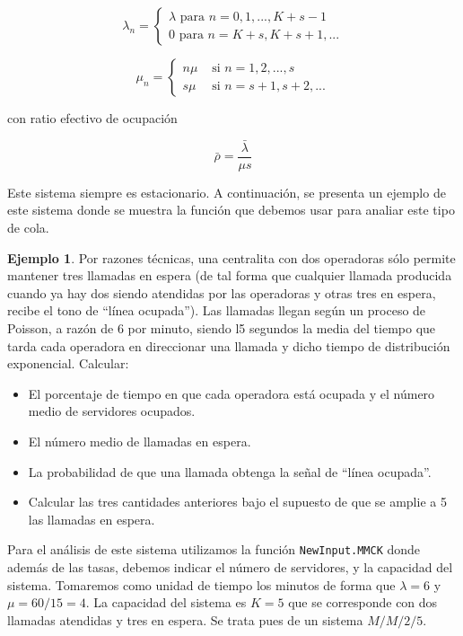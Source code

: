 \documentclass[
]{book}
\providecommand{\tightlist}{%
  \setlength{\itemsep}{0pt}\setlength{\parskip}{0pt}}
\theoremstyle{definition}
\theoremstyle{definition}
\newtheorem{example}{Ejemplo}[chapter]
\theoremstyle{definition}
\theoremstyle{definition}
\theoremstyle{remark}
\begin{document}
\[\lambda_n = 
\begin{cases}
\lambda \text{ para } n = 0, 1,..., K+s-1\\
0 \text{ para } n = K+s, K+s+1,...
\end{cases}
\]

\[\mu_n = 
\begin{cases}
n\mu & \text{ si } n = 1, 2,...,s\\
s\mu & \text{ si } n = s+1, s+2,...
\end{cases}
\]

con ratio efectivo de ocupación

\[\bar{\rho} = \frac{\bar{\lambda}}{\mu s}\]

Este sistema siempre es estacionario. A continuación, se presenta un ejemplo de este sistema donde se muestra la función que debemos usar para analiar este tipo de cola.

\begin{example}

Por razones técnicas, una centralita con dos operadoras sólo permite mantener tres llamadas en espera (de tal forma que cualquier llamada producida cuando ya hay dos siendo atendidas por las operadoras y otras tres en espera, recibe el tono de ``línea ocupada''). Las llamadas llegan según un proceso de Poisson, a razón de 6 por minuto, siendo l5 segundos la media del tiempo que tarda cada operadora en direccionar una llamada y dicho tiempo de distribución exponencial. Calcular:

\begin{itemize}
\tightlist
\item
  El porcentaje de tiempo en que cada operadora está ocupada y el número medio de servidores ocupados.
\item
  El número medio de llamadas en espera.
\item
  La probabilidad de que una llamada obtenga la señal de ``línea ocupada''.
\item
  Calcular las tres cantidades anteriores bajo el supuesto de que se amplie a 5 las llamadas en espera.
\end{itemize}

\end{example}

Para el análisis de este sistema utilizamos la función \texttt{NewInput.MMCK} donde además de las tasas, debemos indicar el número de servidores, y la capacidad del sistema. Tomaremos como unidad de tiempo los minutos de forma que \(\lambda = 6\) y \(\mu = 60/15 = 4\). La capacidad del sistema es \(K = 5\) que se corresponde con dos llamadas atendidas y tres en espera. Se trata pues de un sistema \(M/M/2/5\).
\end{document}
